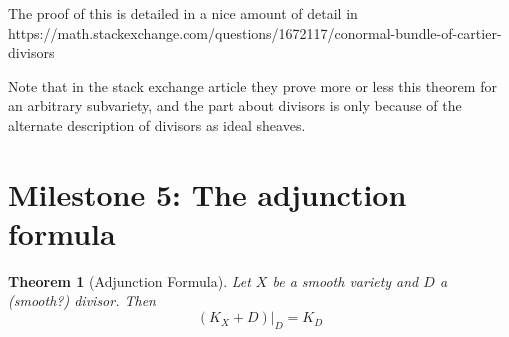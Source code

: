 \documentclass[a4paper]{article}
\newtheorem{thm}{Theorem}[section]
\begin{document}
The proof of this is detailed in a nice amount of detail in
https://math.stackexchange.com/questions/1672117/conormal-bundle-of-cartier-divisors

Note that in the stack exchange article they prove more or less this 
theorem for an arbitrary subvariety, and the part about divisors
is only because of the alternate description of divisors as ideal sheaves.

\section{Milestone 5: The adjunction formula}




\begin{thm}[Adjunction Formula]
	Let \(X\) be a smooth variety and \(D\) a
	(smooth?) divisor. 
	Then 
	\[
		(K_{X} + D)|_{D} = K_{D}
	\] 
	
\end{thm}
\end{document}
